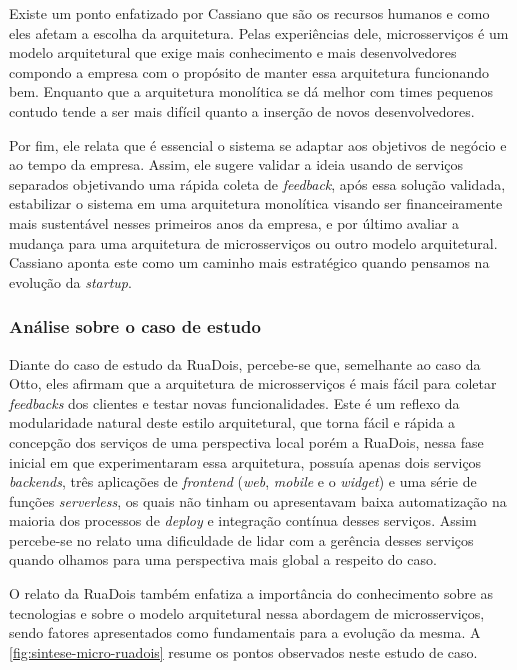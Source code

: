 Existe um ponto enfatizado por Cassiano que são os recursos humanos e como eles afetam a escolha da
arquitetura. Pelas experiências dele, microsserviços é um modelo arquitetural que exige mais conhecimento
e mais desenvolvedores compondo a empresa com o propósito de manter essa arquitetura funcionando bem.
Enquanto que a arquitetura monolítica se dá melhor com times pequenos contudo tende a ser mais difícil
quanto a inserção de novos desenvolvedores.

Por fim, ele relata que é essencial o sistema se adaptar aos objetivos de negócio e ao tempo da
empresa. Assim, ele sugere validar a ideia usando de serviços separados objetivando uma rápida coleta de
\textit{feedback}, após essa solução validada, estabilizar o sistema em uma arquitetura monolítica
visando ser financeiramente mais sustentável nesses primeiros anos da empresa, e por último avaliar
a mudança para uma arquitetura de microsserviços ou outro modelo arquitetural. Cassiano aponta este
como um caminho mais estratégico quando pensamos na evolução da \textit{startup}.

\subsubsection{Análise sobre o caso de estudo}

Diante do caso de estudo da RuaDois, percebe-se que, semelhante ao caso da Otto, eles afirmam que a
arquitetura de microsserviços é mais fácil para coletar \textit{feedbacks} dos clientes e testar
novas funcionalidades. Este é um reflexo da modularidade natural deste estilo arquitetural, que
torna fácil e rápida a concepção dos serviços de uma perspectiva local porém a RuaDois, nessa fase inicial
em que experimentaram essa arquitetura, possuía apenas dois serviços \textit{backends}, três
aplicações de \textit{frontend} (\textit{web}, \textit{mobile} e o \textit{widget}) e uma série de
funções \textit{serverless}, os quais não tinham ou apresentavam baixa automatização na maioria dos processos
de \textit{deploy} e integração contínua desses serviços. Assim percebe-se no relato uma dificuldade de
lidar com a gerência desses serviços quando olhamos para uma perspectiva mais global a respeito do caso.

O relato da RuaDois também enfatiza a importância do conhecimento sobre as tecnologias e sobre o
modelo arquitetural nessa abordagem de microsserviços, sendo fatores apresentados como fundamentais
para a evolução da mesma. A \autoref{fig:sintese-micro-ruadois} resume os pontos observados neste
estudo de caso.

